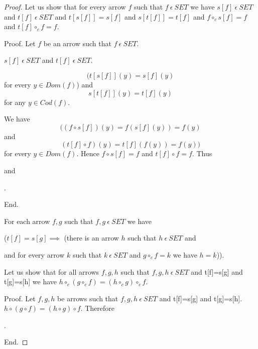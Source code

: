 \documentclass{article}
\newcommand{\mcirc}{\circ_{c}}
\newcommand{\inn}{~\epsilon~}
\begin{document}
\begin{forthel}
\begin{proof}
			Let us show that for every arrow $f$ such that $f \inn SET$ we have
			$s[f] \inn SET$ and $t[f] \inn SET$  
			and $t[s[f]]=s[f]$ and $s[t[f]]=t[f]$  
			and $f \mcirc s[f] = f$ and $t[f] \mcirc f = f$.
			
			Proof.
			Let $f$ be an arrow such that $f \inn SET$.

			$s[f] \inn SET$ and $t[f] \inn SET$.

			$$(t[s[f]](y)=s[f](y)$$ for every  $y \in Dom(f)$) and
			$$s[t[f]](y)=t[f](y)$$ for any $y \in Cod(f)$.
			
			We have
			$$((f \circ s[f])(y) = f(s[f](y)) = f(y)$$ and
			$$(t[f] \circ f)(y) = t[f](f(y)) = f(y))$$
			for every $y \in Dom(f)$.
			Hence $f \circ s[f] = f$ and $t[f] \circ f = f$.
			Thus
			\begin{center}
			\end{center}
			and
			\begin{center}
					.
			\end{center}
			End.
			

			For each arrow $f,g$ such that $f,g \inn SET$ we have
			
			($t[f]=s[g] \implies$ (there is an arrow $h$ such that $h \inn SET$ and 

			\begin{center}
			\end{center}						
			
			and for every arrow $k$ such that $k \inn SET$ and $g \mcirc f = k$ we have $h=k$)).
			

			Let us show that for all arrows $f,g,h$ such that $f,g,h \inn SET$ and t[f]=s[g] and t[g]=s[h]
			we have $h \mcirc (g \mcirc f) = (h \mcirc g) \mcirc f$. 
			
			Proof.
			Let $f,g,h$ be arrows such that $f,g,h \inn SET$ and t[f]=s[g] and t[g]=s[h].
			$h \circ (g \circ f) = (h \circ g) \circ f$.
			Therefore
			\begin{center}
				.
			\end{center}
			End.



\end{proof}
\end{forthel}
\end{document}
